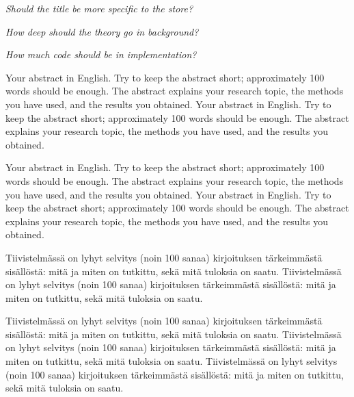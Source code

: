 \documentclass[english,12pt,a4paper,pdftex,sci,utf8]{aaltothesis}
\theoremstyle{definition}
\newcommand{\nyi}[1]{\noindent\colorbox{nyibg}{\textcolor{nyitext}{\emph{#1}}}}
\begin{document}
\begin{abstractpage}[english]

    \nyi{Should the title be more specific to the store?}
    
    \nyi{How deep should the theory go in background?}
    
    \nyi{How much code should be in implementation?}
    

  Your abstract in English. Try to keep the abstract short; approximately 
  100 words should be enough. The abstract explains your research topic, 
  the methods you have used, and the results you obtained.  
  Your abstract in English. Try to keep the abstract short; approximately 
  100 words should be enough. The abstract explains your research topic, 
  the methods you have used, and the results you obtained.  

  Your abstract in English. Try to keep the abstract short; approximately 
  100 words should be enough. The abstract explains your research topic, 
  the methods you have used, and the results you obtained.  
  Your abstract in English. Try to keep the abstract short; approximately 
  100 words should be enough. The abstract explains your research topic, 
  the methods you have used, and the results you obtained.  
\end{abstractpage}

\newpage


\begin{abstractpage}[finnish]
  Tiivistelmässä on lyhyt selvitys (noin 100 sanaa)
  kirjoituksen tärkeimmästä sisällöstä: mitä ja miten on tutkittu,
  sekä mitä tuloksia on saatu. 
  Tiivistelmässä on lyhyt selvitys (noin 100 sanaa)
  kirjoituksen tärkeimmästä sisällöstä: mitä ja miten on tutkittu,
  sekä mitä tuloksia on saatu. 

  Tiivistelmässä on lyhyt selvitys (noin 100 sanaa)
  kirjoituksen tärkeimmästä sisällöstä: mitä ja miten on tutkittu,
  sekä mitä tuloksia on saatu. 
  Tiivistelmässä on lyhyt selvitys (noin 100 sanaa)
  kirjoituksen tärkeimmästä sisällöstä: mitä ja miten on tutkittu,
  sekä mitä tuloksia on saatu. 
  Tiivistelmässä on lyhyt selvitys (noin 100 sanaa)
  kirjoituksen tärkeimmästä sisällöstä: mitä ja miten on tutkittu,
  sekä mitä tuloksia on saatu. 
\end{abstractpage}
\end{document}
